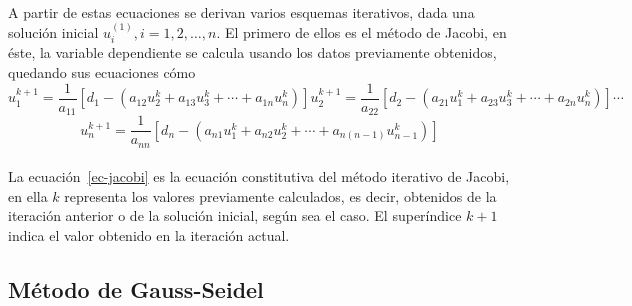 \documentclass[letterpaper, openright, 12pt]{book}
\begin{document}
    \paragraph*{}
        A partir de estas ecuaciones se derivan varios esquemas iterativos, dada
        una solución inicial $u_{i}^{(1)}, i = 1, 2, \dotsc, n$. El primero de
        ellos es el método de Jacobi, en éste, la variable dependiente se
        calcula usando los datos previamente obtenidos, quedando sus ecuaciones
        cómo
        \begin{subequations}
            \begin{equation*}
                u_{1}^{k+1} = \frac{1}{a_{11}} \left[ d_{1} - \left( a_{12}u_{2}^{k} + a_{13}u_{3}^{k} + \dotsb + a_{1n}u_{n}^k \right) \right]
            \end{equation*}
            \begin{equation*}
                u_{2}^{k+1} = \frac{1}{a_{22}} \left[ d_{2}
                - \left( a_{21}u_{1}^{k} + a_{23}u_{3}^{k}
                + \dotsb + a_{2n}u_{n}^{k} \right) \right]
            \end{equation*}
            \begin{equation*}
                \dotsb
            \end{equation*}
        \end{subequations}
        \begin{equation}
            u_{n}^{k+1} = \frac{1}{a_{nn}} \left[ d_{n}
                - \left( a_{n1}u_{1}^{k} + a_{n2}u_{2}^{k}
                + \dotsb + a_{n\left( n-1 \right)}u_{n-1}^{k} \right) \right]
            \label{ec-jacobi}
        \end{equation}
    \paragraph*{}
        La ecuación~\ref{ec-jacobi} es la ecuación constitutiva del método
        iterativo de Jacobi, en ella $k$ representa los valores previamente
        calculados, es decir, obtenidos de la iteración anterior o de la
        solución inicial, según sea el caso. El superíndice $k+1$ indica el
        valor obtenido en la iteración actual.
    \subsection{Método de Gauss-Seidel}
\end{document}

